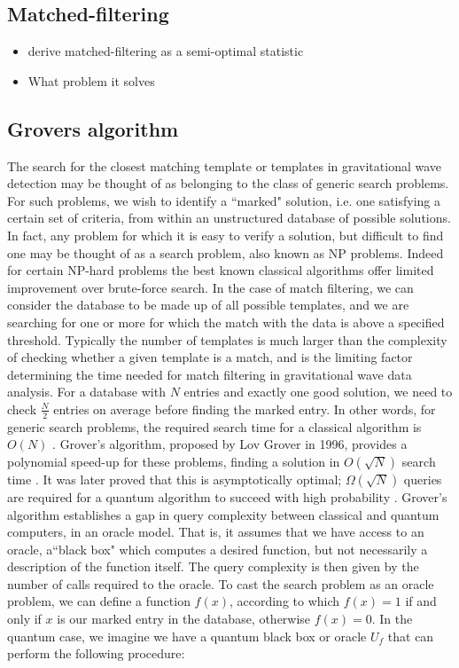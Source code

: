 \documentclass[aps,prd,nofootinbib,twocolumn,reprint,superscriptaddress,showpacs,showkeys,longbibliography]{revtex4-1}
\begin{document}
\subsection{Matched-filtering}

\begin{itemize}
\item derive matched-filtering as a semi-optimal statistic
\item What problem it solves
\end{itemize}

\subsection{Grovers algorithm}

The search for the closest matching template or templates in gravitational wave detection may be thought of as belonging to the class of generic search problems. For such problems, we wish to identify a ``marked" solution, i.e. one satisfying a certain set of criteria, from within an unstructured database of possible solutions. In fact, any problem for which it is easy to verify a solution, but difficult to find one may be thought of as a search problem, also known as NP problems. Indeed for certain NP-hard problems the best known classical algorithms offer limited improvement over brute-force search.\cite{bennett1997strengths} In the case of match filtering, we can consider the database to be made up of all possible templates, and we are searching for one or more for which the match with the data is above a specified threshold. Typically the number of templates is much larger than the complexity of checking whether a given template is a match, and is the limiting factor determining the time needed for match filtering in gravitational wave data analysis. For a database with $N$ entries and exactly one good solution, we need to check $\frac{N}{2}$ entries on average before finding the marked entry. In other words, for generic search problems, the required search time for a classical algorithm is $O(N)$ \cite{barnett2009quantum}. Grover's algorithm, proposed by Lov Grover in 1996, provides a polynomial speed-up for these problems, finding a solution in $O(\sqrt{N})$ search time \cite{grover1996fast}. It was later proved that this is asymptotically optimal; $\Omega(\sqrt{N})$ queries are required for a quantum algorithm to succeed with high probability \cite{bennett1997strengths}.
\newline\newline Grover's algorithm establishes a gap in query complexity between classical and quantum computers, in an oracle model. That is, it assumes that we have access to an oracle, a``black box" which computes a desired function, but not necessarily a description of the function itself. The query complexity is then given by the number of calls required to the oracle. To cast the search problem as an oracle problem, we can define a function $f(x)$, according to which $f(x)=1$ if and only if $x$ is our marked entry in the database, otherwise $f(x)=0$. In the quantum case, we imagine we have a quantum black box or oracle $U_f$ that can perform the following procedure:
\end{document}

